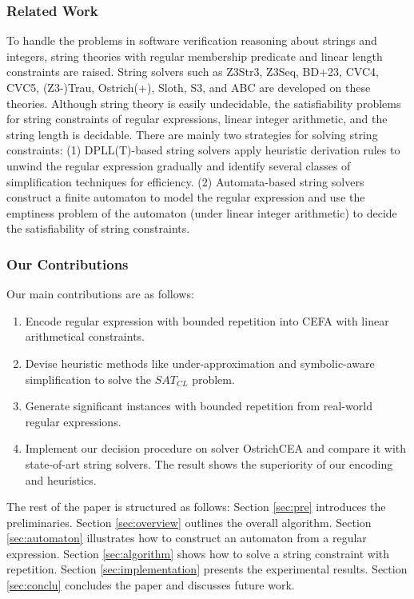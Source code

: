 {\subsubsection{Related Work}
To handle the problems in software verification reasoning about strings and integers, string theories with regular membership predicate and linear length constraints are raised. String solvers such as Z3Str3\cite{z3str3}, Z3Seq\cite{z3seq}, BD+23\cite{BD+23}, CVC4\cite{cvc4}, CVC5\cite{cvc5}, (Z3-)Trau\cite{trau}\cite{z3trau}, Ostrich(+)\cite{ostrich}\cite{atva2020}, Sloth\cite{sloth}, S3\cite{s3}, and ABC\cite{abc} are developed on these theories. Although string theory is easily
undecidable\cite{undecidable_1}\cite{undecidable_2}, the satisfiability problems for string constraints of regular expressions, linear integer arithmetic, and the string length is decidable\cite{theory_BD+23}. There are mainly two strategies for solving string constraints: (1) DPLL(T)-based\cite{dpll_t} string solvers\cite{z3str3}\cite{cvc5} apply heuristic derivation rules to unwind the regular expression gradually and identify several classes of simplification techniques for efficiency. (2) Automata-based string solvers\cite{trau}\cite{z3trau}\cite{ostrich}\cite{atva2020}\cite{BD+23} construct a finite automaton to model the regular expression and use the emptiness problem of the automaton (under linear integer arithmetic) to decide the satisfiability of string constraints. 


\subsubsection{Our Contributions}
Our main contributions are as follows:
\begin{enumerate}
  \item  Encode regular expression with bounded repetition into CEFA with linear arithmetical constraints.
  \item  Devise heuristic methods like under-approximation and symbolic-aware simplification to solve the $SAT_{CL}$ problem.
  \item  Generate significant instances with bounded repetition from real-world regular expressions.
  \item  Implement our decision procedure on solver OstrichCEA and compare it with state-of-art string solvers. The result shows the superiority of our encoding and heuristics.
\end{enumerate}

The rest of the paper is structured as follows: Section \ref{sec:pre} introduces the preliminaries. Section \ref{sec:overview} outlines the overall algorithm. Section \ref{sec:automaton} illustrates how to construct an automaton from a regular expression. Section \ref{sec:algorithm} shows how to solve a string constraint with repetition. Section \ref{sec:implementation} presents the experimental results. Section \ref{sec:conclu} concludes the paper and discusses future work.
}


%
